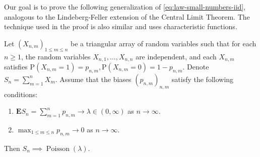 \noindent Our goal is to prove the following generalization of
\eqref{eq:law-small-numbers-iid}, analogous to the
Lindeberg-Feller extension of the Central Limit
Theorem. The technique used in the proof is also
similar and uses characteristic functions.

\begin{thm}
Let $(X_{n,m})_{1\le m\le n}$ be a triangular array
of random variables such that for each $n\ge1$, the
random variables $X_{n,1},\ldots,X_{n,n}$ are
independent, and each $X_{n,m}$ satisfies
$\mathrm{P}(X_{n,m}=1)=p_{n,m},
\mathrm{P}(X_{n,m}=0)=1-p_{n,m}$.
Denote $S_n=\sum_{m=1}^n X_m$. Assume that the biases
$(p_{n,m})_{n,m}$ satisfy the following conditions:

\begin{enumerate}[label=(\roman*)]
\item $\mathbf{E} S_n = \sum_{m=1}^n p_{n,m} \to
\lambda\in(0,\infty)$
as $n\to\infty$.

\item $\max_{1\le m\le n} p_{n,m} \to 0$ as $n\to\infty$.
\end{enumerate}

\noindent Then $S_n \implies \operatorname{Poisson}(\lambda)$.
\end{thm}


